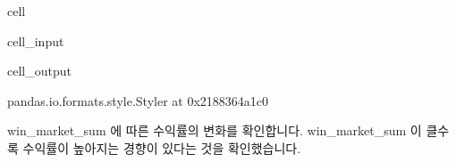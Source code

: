\documentclass[letterpaper,10pt,english]{jupyterBook}
\begin{document}
\begin{sphinxuseclass}{cell}
\begin{sphinxVerbatimInput}
\begin{sphinxuseclass}{cell_input}
\begin{sphinxVerbatim}[commandchars=\\\{\}]
      \PYG{p}{[} \PYG{p}{]} 

\end{sphinxVerbatim}

\end{sphinxuseclass}\end{sphinxVerbatimInput}
\begin{sphinxVerbatimOutput}

\begin{sphinxuseclass}{cell_output}
\begin{sphinxVerbatim}[commandchars=\\\{\}]
\PYGZlt{}pandas.io.formats.style.Styler at 0x2188364a1c0\PYGZgt{}
\end{sphinxVerbatim}

\end{sphinxuseclass}\end{sphinxVerbatimOutput}

\end{sphinxuseclass}
\sphinxAtStartPar
 win\_market\_sum 에 따른 수익률의 변화를 확인합니다. win\_market\_sum 이 클수록 수익률이 높아지는 경향이 있다는 것을 확인했습니다.
\end{document}
